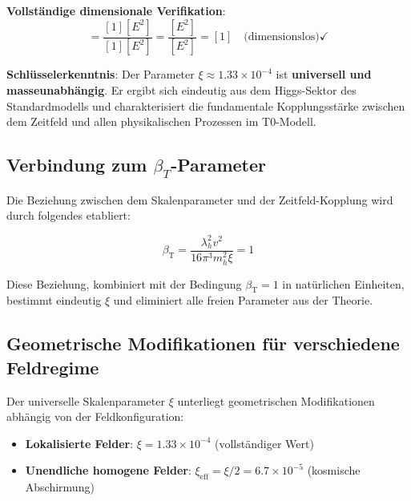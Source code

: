 \documentclass[12pt,a4paper]{article}
\newcommand{\betaT}{\beta_{\text{T}}}
\newcommand{\xipar}{\xi}
\theoremstyle{definition}
\theoremstyle{remark}
\begin{document}
	\textbf{Vollständige dimensionale Verifikation}:
	\begin{equation}
		[\xi] = \frac{[1][E^2]}{[1][E^2]} = \frac{[E^2]}{[E^2]} = [1] \quad \text{(dimensionslos)} \checkmark
	\end{equation}
	
	\begin{tcolorbox}[colback=green!5!white,colframe=green!75!black,title=Universeller Skalenparameter]
		\textbf{Schlüsselerkenntnis}: Der Parameter $\xi \approx 1.33 \times 10^{-4}$ ist \textbf{universell und masseunabhängig}. Er ergibt sich eindeutig aus dem Higgs-Sektor des Standardmodells und charakterisiert die fundamentale Kopplungsstärke zwischen dem Zeitfeld und allen physikalischen Prozessen im T0-Modell.
	\end{tcolorbox}
	
	\subsection{Verbindung zum $\beta_T$-Parameter}
	\label{subsec:beta_t_verbindung}
	
	Die Beziehung zwischen dem Skalenparameter und der Zeitfeld-Kopplung wird durch folgendes etabliert:
	
	\begin{equation}
		\betaT = \frac{\lambda_h^2 v^2}{16\pi^3 m_h^2 \xi} = 1
		\label{eq:beta_t_beziehung}
	\end{equation}
	
	Diese Beziehung, kombiniert mit der Bedingung $\betaT = 1$ in natürlichen Einheiten, bestimmt eindeutig $\xipar$ und eliminiert alle freien Parameter aus der Theorie.
	
	\subsection{Geometrische Modifikationen für verschiedene Feldregime}
	\label{subsec:geometrische_modifikationen}
	
	Der universelle Skalenparameter $\xipar$ unterliegt geometrischen Modifikationen abhängig von der Feldkonfiguration:
	
	\begin{itemize}
		\item \textbf{Lokalisierte Felder}: $\xipar = 1.33 \times 10^{-4}$ (vollständiger Wert)
		\item \textbf{Unendliche homogene Felder}: $\xi_{\text{eff}} = \xipar/2 = 6.7 \times 10^{-5}$ (kosmische Abschirmung)
	\end{itemize}
	
\end{document}

